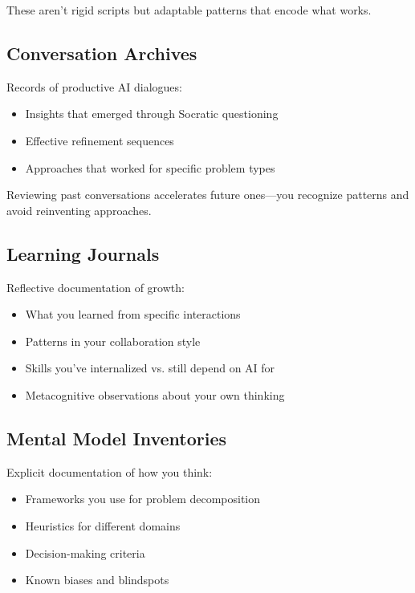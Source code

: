 These aren't rigid scripts but adaptable patterns that encode what works.

\subsection{Conversation Archives}

Records of productive AI dialogues:

\begin{itemize}
    \item Insights that emerged through Socratic questioning
    \item Effective refinement sequences
    \item Approaches that worked for specific problem types
\end{itemize}

Reviewing past conversations accelerates future ones---you recognize patterns and avoid reinventing approaches.

\subsection{Learning Journals}

Reflective documentation of growth:

\begin{itemize}
    \item What you learned from specific interactions
    \item Patterns in your collaboration style
    \item Skills you've internalized vs. still depend on AI for
    \item Metacognitive observations about your own thinking
\end{itemize}

\subsection{Mental Model Inventories}

Explicit documentation of how you think:

\begin{itemize}
    \item Frameworks you use for problem decomposition
    \item Heuristics for different domains
    \item Decision-making criteria
    \item Known biases and blindspots
\end{itemize}


